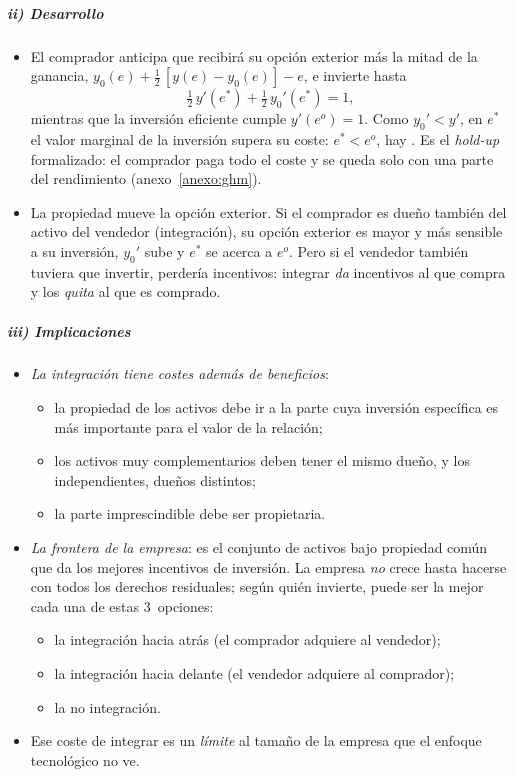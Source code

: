 \documentclass[11pt]{article}
\begin{document}
\subparagraph{ii) Desarrollo}

\begin{itemize}
\item El comprador anticipa que recibirá su opción exterior más la mitad de la ganancia, $y_0(e)+\tfrac12\,[y(e)-y_0(e)]-e$, e invierte hasta
  \[
  \tfrac12\,y'(e^{*})+\tfrac12\,y_0'(e^{*})=1,
  \]
  mientras que la inversión eficiente cumple $y'(e^{o})=1$. Como $y_0'<y'$, en $e^{*}$ el valor marginal de la inversión supera su coste: $e^{*}<e^{o}$, hay . Es el \emph{hold-up} formalizado: el comprador paga todo el coste y se queda solo con una parte del rendimiento (anexo~\ref{anexo:ghm}).
\item La propiedad mueve la opción exterior. Si el comprador es dueño también del activo del vendedor (integración), su opción exterior es mayor y más sensible a su inversión, $y_0'$ sube y $e^{*}$ se acerca a $e^{o}$. Pero si el vendedor también tuviera que invertir, perdería incentivos: integrar \emph{da} incentivos al que compra y los \emph{quita} al que es comprado.
\end{itemize}

\subparagraph{iii) Implicaciones}

\begin{itemize}
\item \emph{La integración tiene costes además de beneficios}:
  \begin{itemize}
  \item la propiedad de los activos debe ir a la parte cuya inversión específica es más importante para el valor de la relación\nocite{GrossmanHart1986Costs};
  \item los activos muy complementarios deben tener el mismo dueño, y los independientes, dueños distintos;
  \item la parte imprescindible debe ser propietaria\nocite{HartMoore1990Property}.
  \end{itemize}
\item \emph{La frontera de la empresa}: es el conjunto de activos bajo propiedad común que da los mejores incentivos de inversión. La empresa \emph{no} crece hasta hacerse con todos los derechos residuales; según quién invierte, puede ser la mejor cada una de estas 3~opciones:
  \begin{itemize}
  \item la integración hacia atrás (el comprador adquiere al vendedor);
  \item la integración hacia delante (el vendedor adquiere al comprador);
  \item la no integración.
  \end{itemize}
\item Ese coste de integrar es un \emph{límite} al tamaño de la empresa que el enfoque tecnológico no ve.
\end{itemize}
\end{document}

